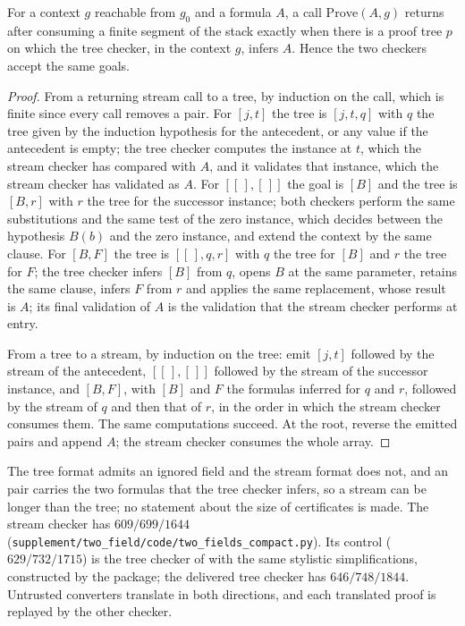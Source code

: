 \begin{proposition}\label{cert:prop:k-stream}
For a context $g$ reachable from $g_0$ and a formula $A$, a call
$\mathrm{Prove}(A,g)$ returns after consuming a finite segment of the stack
exactly when there is a proof tree $p$ on which the tree checker, in the
context $g$, infers $A$. Hence the two checkers accept the same goals.
\end{proposition}
\begin{proof}
From a returning stream call to a tree, by induction on the call, which is
finite since every call removes a pair. For $[j,t]$ the tree is $[j,t,q]$ with
$q$ the tree given by the induction hypothesis for the antecedent, or any value
if the antecedent is empty; the tree checker computes the instance at $t$,
which the stream checker has compared with $A$, and it validates that instance,
which the stream checker has validated as $A$. For $[[\,],[\,]]$ the goal is
$[B]$ and the tree is $[B,r]$ with $r$ the tree for the successor instance;
both checkers perform the same substitutions and the same test of the zero
instance, which decides between the hypothesis $B(b)$ and the zero instance,
and extend the context by the same clause. For $[B,F]$ the tree is
$[[\,],q,r]$ with $q$ the tree for $[B]$ and $r$ the tree for $F$; the tree
checker infers $[B]$ from $q$, opens $B$ at the same parameter, retains the
same clause, infers $F$ from $r$ and applies the same replacement, whose result
is $A$; its final validation of $A$ is the validation that the stream checker
performs at entry.

From a tree to a stream, by induction on the tree: emit $[j,t]$ followed by
the stream of the antecedent, $[[\,],[\,]]$ followed by the stream of the
successor instance, and $[B,F]$, with $[B]$ and $F$ the formulas inferred for
$q$ and $r$, followed by the stream of $q$ and then that of $r$, in the order in
which the stream checker consumes them. The same computations succeed. At the
root, reverse the emitted pairs and append $A$; the stream checker consumes
the whole array.
\end{proof}

The tree format admits an ignored field and the stream format does not, and an
 pair carries the two formulas that the tree checker infers,
so a stream can be longer than the tree; no statement about the size of
certificates is made. The stream checker has $609/699/1644$
(\texttt{supplement/two\_field/code/two\_fields\_compact.py}). Its control
($629/732/1715$) is the tree checker of  with the same
stylistic simplifications, constructed by the package; the delivered tree
checker has $646/748/1844$. Untrusted converters translate in both directions,
and each translated proof is replayed by the other checker.

